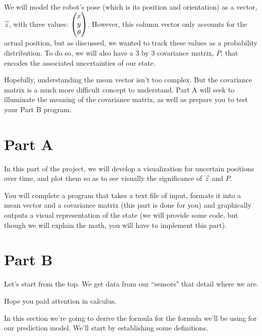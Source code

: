 \documentclass[12pt]{article}
\newcommand*\colvec[3][]{
	\begin{pmatrix}\ifx\relax#1\relax\else#1\\\fi#2\\#3\end{pmatrix}
}
\begin{document}
We will model the robot's pose (which is its position and orientation) as a vector, $\vec{z}$, with three values: $\colvec[x]{y}{\theta}$. However, this column vector only accounts for the actual position, but as discussed, we wanted to track these values as a probability distribution. To do so, we will also have a 3 by 3 covariance matrix, $P$, that encodes the associated uncertainties of our state.

Hopefully, understanding the mean vector isn't too complex. But the covariance matrix is a much more difficult concept to understand. Part A will seek to illuminate the meaning of the covariance matrix, as well as prepare you to test your Part B program.

\section{Part A}

In this part of the project, we will develop a visualization for uncertain positions over time, and plot them so as to see visually the significance of $\vec{z}$ and $P$.

You will complete a program that takes a text file of input, formats it into a mean vector and a covariance matrix (this part is done for you) and graphically outputs a visual representation of the state (we will provide some code, but though we will explain the math, you will have to implement this part).

\section{Part B}

Let's start from the top. We get data from our ``sensors" that detail where we are.

Hope you paid attention in calculus. 

In this section we're going to derive the formula for the formula we'll be using for our prediction model. We'll start by establishing some definitions.
\end{document}
